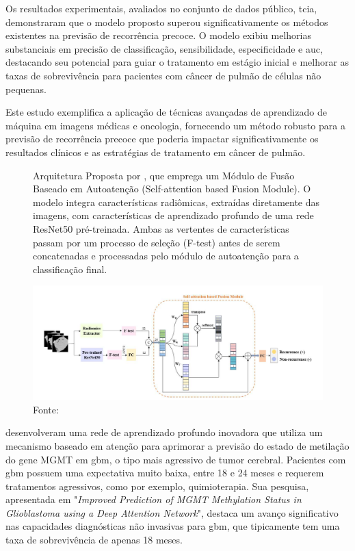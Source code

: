 Os resultados experimentais, avaliados no conjunto de dados público, \gls{tcia}, demonstraram que o modelo proposto superou significativamente os métodos existentes na previsão de recorrência precoce. O modelo exibiu melhorias substanciais em precisão de classificação, sensibilidade, especificidade e \gls{auc}, destacando seu potencial para guiar o tratamento em estágio inicial e melhorar as taxas de sobrevivência para pacientes com câncer de pulmão de células não pequenas.

Este estudo exemplifica a aplicação de técnicas avançadas de aprendizado de máquina em imagens médicas e oncologia, fornecendo um método robusto para a previsão de recorrência precoce que poderia impactar significativamente os resultados clínicos e as estratégias de tratamento em câncer de pulmão.

\begin{figure}[htbp]
    \centering
    \captionsetup{width=0.98\textwidth, justification=justified}
    \caption{Arquitetura Proposta por 
    , que emprega um Módulo de Fusão Baseado em Autoatenção (Self-attention based Fusion Module). O modelo integra características radiômicas, extraídas diretamente das imagens, com características de aprendizado profundo de uma rede ResNet50 pré-treinada. Ambas as vertentes de características passam por um processo de seleção (F-test) antes de serem concatenadas e processadas pelo módulo de autoatenção para a classificação final.}
    \includegraphics[scale=0.5]{figures/fig008.png}
    \caption*{Fonte: \cite{aiSelfAttentionBasedFusion2023}}
    \label{fig:fig008}
\end{figure}

desenvolveram uma rede de aprendizado profundo inovadora que utiliza um mecanismo baseado em atenção para aprimorar a previsão do estado de metilação do gene MGMT em \gls{gbm}, o tipo mais agressivo de tumor cerebral. Pacientes com \gls{gbm} possuem uma expectativa muito baixa, entre 18 e 24 meses e requerem tratamentos agressivos, como por exemplo, quimioterapia. Sua pesquisa, apresentada em "\textit{Improved Prediction of MGMT Methylation Status in Glioblastoma using a Deep Attention Network}", destaca um avanço significativo nas capacidades diagnósticas não invasivas para \gls{gbm}, que tipicamente tem uma taxa de sobrevivência de apenas 18 meses.

